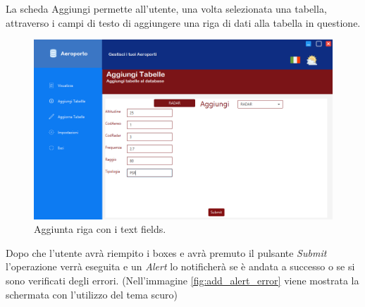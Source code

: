 \textsf{\small La scheda Aggiungi permette all'utente, una volta selezionata una tabella, attraverso i campi di testo di aggiungere una riga di dati alla tabella in questione.}\\

\begin{figure}[H] 
	\centering
	\includegraphics[width=1\textwidth, height=1\textheight, keepaspectratio]{./img/Applicativo/add_table.png}
	\caption{Aggiunta riga con i text fields.}
	\label{fig:add_table}
\end{figure}

\textsf{\small Dopo che l'utente avrà riempito i boxes e avrà premuto il pulsante \emph{Submit} l'operazione verrà eseguita e un \emph{Alert} lo notificherà se è andata a successo o se si sono verificati degli errori. (Nell'immagine \ref{fig:add_alert_error} viene mostrata la schermata con l'utilizzo del tema scuro) }\\

